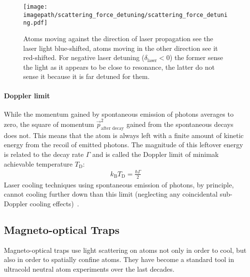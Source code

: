 \begin{figure}
    \centering
    \texttt{[image: \\imagepath/scattering\_force\_detuning/scattering\_force\_detuning.pdf]}
    \caption{Atoms moving against the direction of laser propagation see the laser light blue-shifted, atoms moving in the other direction see it red-shifted. For negative laser detuning ($\delta_\text{laser} < 0$) the former sense the light as it appears to be close to resonance, the latter do not sense it because it is far detuned for them.}\label{fig:scattering_force_detuning}
\end{figure}

\paragraph*{Doppler limit} While the momentum gained by spontaneous emission of photons averages to zero, the square of momentum $\vec p_\text{after decay}^2$ gained from the spontaneous decays does not. This means that the atom is always left with a finite amount of kinetic energy from the recoil of emitted photons. The magnitude of this leftover energy is related to the decay rate $\Gamma$ and is called the Doppler limit of minimak achievable temperature $T_\text{D}$:
\begin{align}
    k_\text{B} T_\text{D} = \frac{\hbar \Gamma}{2}
\end{align}
Laser cooling techniques using spontaneous emission of photons, by principle, cannot cooling further down than this limit (neglecting any coincidental sub-Doppler cooling effects)~\cite{foot_atomic_2005}.

\subsection*{Magneto-optical Traps}
Magneto-optical traps use light scattering on atoms not only in order to cool, but also in order to spatially confine atoms. They have become a standard tool in ultracold neutral atom experiments over the last decades.

